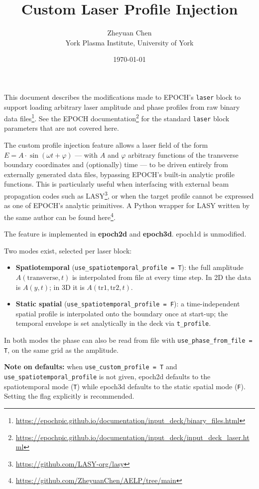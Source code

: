 \documentclass[11pt,a4paper]{article}
\title{Custom Laser Profile Injection}
\author{Zheyuan Chen \\ York Plasma Institute, University of York}
\date{\today}
\begin{document}
\maketitle

This document describes the modifications made to EPOCH's \texttt{laser}
block to support loading arbitrary laser amplitude and phase profiles from
raw binary data files\footnote{\url{https://epochpic.github.io/documentation/input_deck/binary_files.html}}.
See the EPOCH documentation\footnote{\url{https://epochpic.github.io/documentation/input_deck/input_deck_laser.html}}
for the standard \texttt{laser} block parameters that are not covered here.

The custom profile injection feature allows a laser field of the form
$E = A \cdot \sin(\omega t + \varphi)$ --- with $A$ and $\varphi$ arbitrary
functions of the transverse boundary coordinates and (optionally) time ---
to be driven entirely from externally generated data files, bypassing
EPOCH's built-in analytic profile functions. This is particularly useful
when interfacing with external beam propagation codes such as
LASY\footnote{\url{https://github.com/LASY-org/lasy}}, or when the target
profile cannot be expressed as one of EPOCH's analytic primitives. A Python
wrapper for LASY written by the same author can be found
here\footnote{\url{https://github.com/ZheyuanChen/AELP/tree/main}}.

The feature is implemented in \textbf{epoch2d} and \textbf{epoch3d}. epoch1d is unmodified.

Two modes exist, selected per laser block:

\begin{itemize}
  \item \textbf{Spatiotemporal} (\texttt{use\_spatiotemporal\_profile = T}):
    the full amplitude $A(\mathrm{transverse}, t)$ is interpolated from
    file at every time step. In 2D the data is $A(y, t)$; in 3D it is
    $A(\mathrm{tr1}, \mathrm{tr2}, t)$.
  \item \textbf{Static spatial} (\texttt{use\_spatiotemporal\_profile = F}):
    a time-independent spatial profile is interpolated onto the boundary
    once at start-up; the temporal envelope is set analytically in the
    deck via \texttt{t\_profile}.
\end{itemize}

In both modes the phase can also be read from file with
\texttt{use\_phase\_from\_file = T}, on the same grid as the amplitude.

\textbf{Note on defaults:} when \texttt{use\_custom\_profile = T} and
\texttt{use\_spatiotemporal\_profile} is not given, epoch2d defaults to the
spatiotemporal mode (\texttt{T}) while epoch3d defaults to the static
spatial mode (\texttt{F}). Setting the flag explicitly is recommended.
\end{document}
